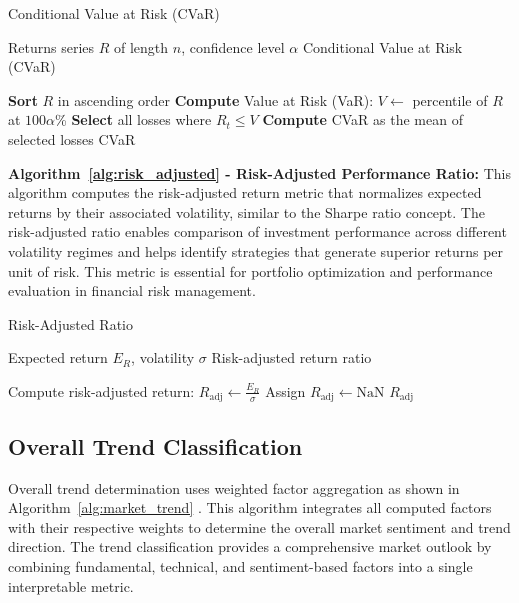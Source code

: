 \documentclass[3p,times,procedia]{elsarticle}
\begin{document}
\begin{algorithm}[H]
\caption{Conditional Value at Risk (CVaR)}
\label{alg:cvar}
\begin{algorithmic}[1]
    \Require Returns series $R$ of length $n$, confidence level $\alpha$
    \Ensure Conditional Value at Risk (CVaR)
    
    \State \textbf{Sort} $R$ in ascending order 
    \State \textbf{Compute} Value at Risk (VaR): $V \gets$ percentile of $R$ at $100\alpha$\%
    \State \textbf{Select} all losses where $R_t \leq V$
    \State \textbf{Compute} CVaR as the mean of selected losses
    \State \Return CVaR
\end{algorithmic}
\end{algorithm}

\textbf{Algorithm~\ref{alg:risk_adjusted} - Risk-Adjusted Performance Ratio:} This algorithm computes the risk-adjusted return metric that normalizes expected returns by their associated volatility, similar to the Sharpe ratio concept. The risk-adjusted ratio enables comparison of investment performance across different volatility regimes and helps identify strategies that generate superior returns per unit of risk. This metric is essential for portfolio optimization and performance evaluation in financial risk management.

\begin{algorithm}[H]
\caption{Risk-Adjusted Ratio}
\label{alg:risk_adjusted}
\begin{algorithmic}[1]
    \Require Expected return $E_R$, volatility $\sigma$
    \Ensure Risk-adjusted return ratio
    
        \State Compute risk-adjusted return: $R_{\text{adj}} \gets \frac{E_R}{\sigma}$
    \Else
        \State Assign $R_{\text{adj}} \gets \text{NaN}$
    \EndIf
    \State \Return $R_{\text{adj}}$
\end{algorithmic}
\end{algorithm}

\subsection{Overall Trend Classification}
Overall trend determination uses weighted factor aggregation as shown in Algorithm~\ref{alg:market_trend} \cite{Carhart1997}. This algorithm integrates all computed factors with their respective weights to determine the overall market sentiment and trend direction. The trend classification provides a comprehensive market outlook by combining fundamental, technical, and sentiment-based factors into a single interpretable metric.
\end{document}
